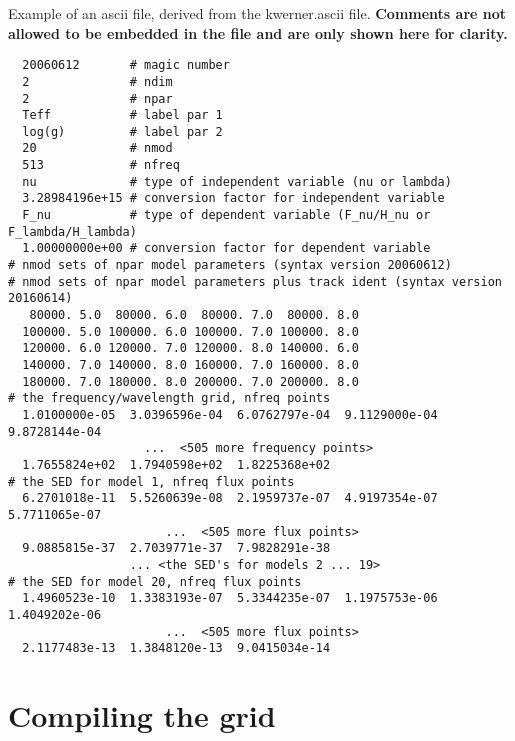 \begin{table}
  \caption[Example of an ascii file, derived from the kwerner.ascii file.]
  {Example of an ascii file, derived from the kwerner.ascii file.
    {\bf Comments are not allowed to be embedded in the file and are only shown here for clarity.}
    \label{def}}
  \small
\begin{verbatim}
  20060612       # magic number
  2              # ndim
  2              # npar
  Teff           # label par 1
  log(g)         # label par 2
  20             # nmod
  513            # nfreq
  nu             # type of independent variable (nu or lambda)
  3.28984196e+15 # conversion factor for independent variable
  F_nu           # type of dependent variable (F_nu/H_nu or F_lambda/H_lambda)
  1.00000000e+00 # conversion factor for dependent variable
# nmod sets of npar model parameters (syntax version 20060612)
# nmod sets of npar model parameters plus track ident (syntax version 20160614)
   80000. 5.0  80000. 6.0  80000. 7.0  80000. 8.0
  100000. 5.0 100000. 6.0 100000. 7.0 100000. 8.0
  120000. 6.0 120000. 7.0 120000. 8.0 140000. 6.0
  140000. 7.0 140000. 8.0 160000. 7.0 160000. 8.0
  180000. 7.0 180000. 8.0 200000. 7.0 200000. 8.0
# the frequency/wavelength grid, nfreq points
  1.0100000e-05  3.0396596e-04  6.0762797e-04  9.1129000e-04  9.8728144e-04
                   ...  <505 more frequency points>
  1.7655824e+02  1.7940598e+02  1.8225368e+02
# the SED for model 1, nfreq flux points
  6.2701018e-11  5.5260639e-08  2.1959737e-07  4.9197354e-07  5.7711065e-07
                      ...  <505 more flux points>
  9.0885815e-37  2.7039771e-37  7.9828291e-38
                 ... <the SED's for models 2 ... 19>
# the SED for model 20, nfreq flux points
  1.4960523e-10  1.3383193e-07  5.3344235e-07  1.1975753e-06  1.4049202e-06
                      ...  <505 more flux points>
  2.1177483e-13  1.3848120e-13  9.0415034e-14
\end{verbatim}
\end{table}

\section{Compiling the grid}
\label{compiling}

